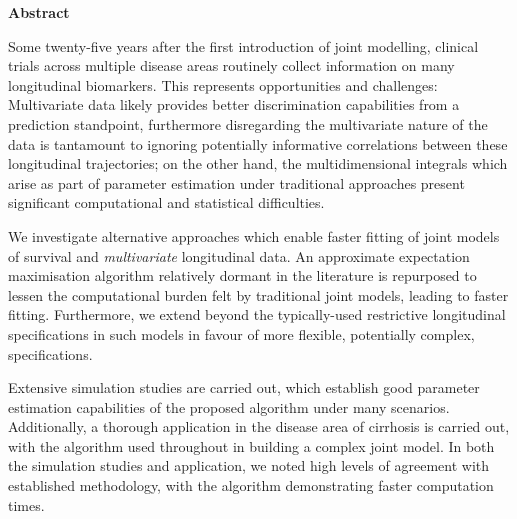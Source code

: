 \begin{center}
{\Huge \bf Abstract}
\end{center}
\noindent

    Some twenty-five years after the first introduction of joint modelling, clinical trials across multiple disease areas routinely collect information on many longitudinal biomarkers. This represents opportunities and challenges: Multivariate data likely provides better discrimination capabilities from a prediction standpoint, furthermore disregarding the multivariate nature of the data is tantamount to ignoring potentially informative correlations between these longitudinal trajectories; on the other hand, the multidimensional integrals which arise as part of parameter estimation under traditional approaches present significant computational and statistical difficulties.

    We investigate alternative approaches which enable faster fitting of joint models of survival and \textit{multivariate} longitudinal data. An approximate expectation maximisation algorithm relatively dormant in the literature is repurposed to lessen the computational burden felt by traditional joint models, leading to faster fitting. Furthermore, we extend beyond the typically-used restrictive longitudinal specifications in such models in favour of more flexible, potentially complex, specifications. 
    
    Extensive simulation studies are carried out, which establish good parameter estimation capabilities of the proposed algorithm under many scenarios. Additionally, a thorough application in the disease area of cirrhosis is carried out, with the algorithm used throughout in building a complex joint model. In both the simulation studies and application, we noted high levels of agreement with established methodology, with the algorithm demonstrating faster computation times.

\thispagestyle{empty}
\restoregeometry